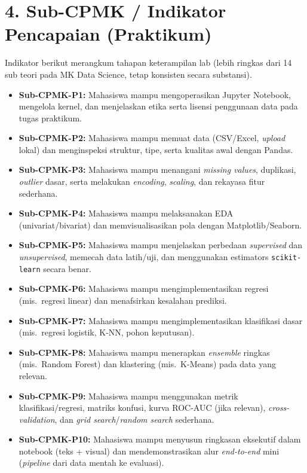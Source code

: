 \documentclass[12pt,a4paper]{article}
\begin{document}
\section*{4. Sub-CPMK / Indikator Pencapaian (Praktikum)}

Indikator berikut merangkum tahapan keterampilan lab (lebih ringkas dari 14 sub teori pada MK Data Science, tetap konsisten secara substansi).

\begin{itemize}[leftmargin=*]
  \item \textbf{Sub-CPMK-P1:} Mahasiswa mampu mengoperasikan Jupyter Notebook, mengelola kernel, dan menjelaskan etika serta lisensi penggunaan data pada tugas praktikum.

  \item \textbf{Sub-CPMK-P2:} Mahasiswa mampu memuat data (CSV/Excel, \textit{upload} lokal) dan menginspeksi struktur, tipe, serta kualitas awal dengan Pandas.

  \item \textbf{Sub-CPMK-P3:} Mahasiswa mampu menangani \textit{missing values}, duplikasi, \textit{outlier} dasar, serta melakukan \textit{encoding}, \textit{scaling}, dan rekayasa fitur sederhana.

  \item \textbf{Sub-CPMK-P4:} Mahasiswa mampu melaksanakan EDA (univariat/bivariat) dan memvisualisasikan pola dengan Matplotlib/Seaborn.

  \item \textbf{Sub-CPMK-P5:} Mahasiswa mampu menjelaskan perbedaan \textit{supervised} dan \textit{unsupervised}, memecah data latih/uji, dan menggunakan estimators \texttt{scikit-learn} secara benar.

  \item \textbf{Sub-CPMK-P6:} Mahasiswa mampu mengimplementasikan regresi (mis.\ regresi linear) dan menafsirkan kesalahan prediksi.

  \item \textbf{Sub-CPMK-P7:} Mahasiswa mampu mengimplementasikan klasifikasi dasar (mis.\ regresi logistik, K-NN, pohon keputusan).

  \item \textbf{Sub-CPMK-P8:} Mahasiswa mampu menerapkan \textit{ensemble} ringkas (mis.\ Random Forest) dan klastering (mis.\ K-Means) pada data yang relevan.

  \item \textbf{Sub-CPMK-P9:} Mahasiswa mampu menggunakan metrik klasifikasi/regresi, matriks konfusi, kurva ROC-AUC (jika relevan), \textit{cross-validation}, dan \textit{grid search}/\textit{random search} sederhana.

  \item \textbf{Sub-CPMK-P10:} Mahasiswa mampu menyusun ringkasan eksekutif dalam notebook (teks + visual) dan mendemonstrasikan alur \textit{end-to-end} mini (\textit{pipeline} dari data mentah ke evaluasi).
\end{itemize}
\end{document}
